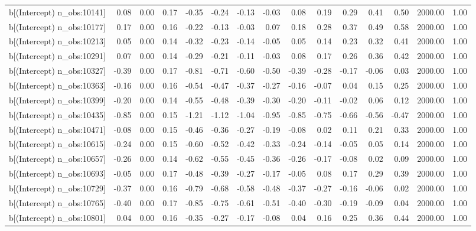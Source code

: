 \begin{table}[ht]
\begin{tabular}{rrrrrrrrrrrrrrr}
  b[(Intercept) n\_obs:10141] & 0.08 & 0.00 & 0.17 & -0.35 & -0.24 & -0.13 & -0.03 & 0.08 & 0.19 & 0.29 & 0.41 & 0.50 & 2000.00 & 1.00 \\ 
  b[(Intercept) n\_obs:10177] & 0.17 & 0.00 & 0.16 & -0.22 & -0.13 & -0.03 & 0.07 & 0.18 & 0.28 & 0.37 & 0.49 & 0.58 & 2000.00 & 1.00 \\ 
  b[(Intercept) n\_obs:10213] & 0.05 & 0.00 & 0.14 & -0.32 & -0.23 & -0.14 & -0.05 & 0.05 & 0.14 & 0.23 & 0.32 & 0.41 & 2000.00 & 1.00 \\ 
  b[(Intercept) n\_obs:10291] & 0.07 & 0.00 & 0.14 & -0.29 & -0.21 & -0.11 & -0.03 & 0.08 & 0.17 & 0.26 & 0.36 & 0.42 & 2000.00 & 1.00 \\ 
  b[(Intercept) n\_obs:10327] & -0.39 & 0.00 & 0.17 & -0.81 & -0.71 & -0.60 & -0.50 & -0.39 & -0.28 & -0.17 & -0.06 & 0.03 & 2000.00 & 1.00 \\ 
  b[(Intercept) n\_obs:10363] & -0.16 & 0.00 & 0.16 & -0.54 & -0.47 & -0.37 & -0.27 & -0.16 & -0.07 & 0.04 & 0.15 & 0.25 & 2000.00 & 1.00 \\ 
  b[(Intercept) n\_obs:10399] & -0.20 & 0.00 & 0.14 & -0.55 & -0.48 & -0.39 & -0.30 & -0.20 & -0.11 & -0.02 & 0.06 & 0.12 & 2000.00 & 1.00 \\ 
  b[(Intercept) n\_obs:10435] & -0.85 & 0.00 & 0.15 & -1.21 & -1.12 & -1.04 & -0.95 & -0.85 & -0.75 & -0.66 & -0.56 & -0.47 & 2000.00 & 1.00 \\ 
  b[(Intercept) n\_obs:10471] & -0.08 & 0.00 & 0.15 & -0.46 & -0.36 & -0.27 & -0.19 & -0.08 & 0.02 & 0.11 & 0.21 & 0.33 & 2000.00 & 1.00 \\ 
  b[(Intercept) n\_obs:10615] & -0.24 & 0.00 & 0.15 & -0.60 & -0.52 & -0.42 & -0.33 & -0.24 & -0.14 & -0.05 & 0.05 & 0.14 & 2000.00 & 1.00 \\ 
  b[(Intercept) n\_obs:10657] & -0.26 & 0.00 & 0.14 & -0.62 & -0.55 & -0.45 & -0.36 & -0.26 & -0.17 & -0.08 & 0.02 & 0.09 & 2000.00 & 1.00 \\ 
  b[(Intercept) n\_obs:10693] & -0.05 & 0.00 & 0.17 & -0.48 & -0.39 & -0.27 & -0.17 & -0.05 & 0.08 & 0.17 & 0.29 & 0.39 & 2000.00 & 1.00 \\ 
  b[(Intercept) n\_obs:10729] & -0.37 & 0.00 & 0.16 & -0.79 & -0.68 & -0.58 & -0.48 & -0.37 & -0.27 & -0.16 & -0.06 & 0.02 & 2000.00 & 1.00 \\ 
  b[(Intercept) n\_obs:10765] & -0.40 & 0.00 & 0.17 & -0.85 & -0.75 & -0.61 & -0.51 & -0.40 & -0.30 & -0.19 & -0.09 & 0.04 & 2000.00 & 1.00 \\ 
  b[(Intercept) n\_obs:10801] & 0.04 & 0.00 & 0.16 & -0.35 & -0.27 & -0.17 & -0.08 & 0.04 & 0.16 & 0.25 & 0.36 & 0.44 & 2000.00 & 1.00 \\ 

\end{tabular}
\end{table}
